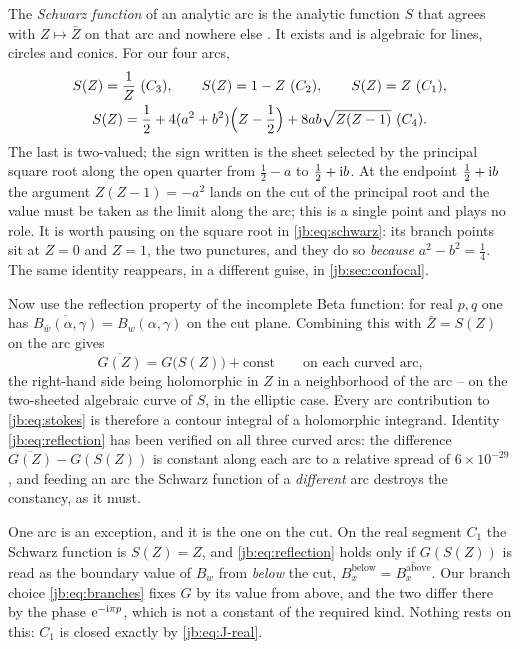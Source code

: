 The \emph{Schwarz function} of an analytic arc is the analytic function $S$ that agrees with
$Z \mapsto \bar Z$ on that arc and nowhere else \cite{Davis:1974:SchwarzFunction}.
It exists and is algebraic for lines, circles and conics.
For our four arcs,
\begin{subequations}
  \label{jb:eq:schwarz}
\begin{gather}
  S(Z)
    = \frac{1}{Z} \ (C_3),
  \qquad
  S(Z)
    = 1 - Z \ (C_2),
  \qquad
  S(Z)
    = Z \ (C_1),
  \\
  S(Z)
    = \frac12 + 4 (a^2 + b^2) \Bigl( Z - \frac12 \Bigr) + 8 a b \sqrt{Z (Z - 1)} \ (C_4).
\end{gather}
\end{subequations}
The last is two-valued; the sign written is the sheet selected by the principal square root along
the open quarter from $\tfrac12 - a$ to $\tfrac12 + \mathrm{i} b$.
At the endpoint $\tfrac12 + \mathrm{i} b$ the argument $Z(Z - 1) = -a^2$ lands on the cut of the principal
root and the value must be taken as the limit along the arc; this is a single point and plays no
role.
It is worth pausing on the square root in \eqref{jb:eq:schwarz}: its branch points sit at $Z = 0$ and
$Z = 1$, the two punctures, and they do so \emph{because} $a^2 - b^2 = \tfrac14$.
The same identity reappears, in a different guise, in \cref{jb:sec:confocal}.

Now use the reflection property of the incomplete Beta function: for real $p, q$ one has
$\overline{B_{\bar w}(\alpha, \gamma)} = B_w(\alpha, \gamma)$ on the cut plane.
Combining this with $\bar Z = S(Z)$ on the arc gives
\begin{equation}
  \label{jb:eq:reflection}
  \overline{G(Z)}
    = G \bigl( S(Z) \bigr) + \text{const}
  \qquad \text{on each curved arc,}
\end{equation}
the right-hand side being holomorphic in $Z$ in a neighborhood of the arc -- on the two-sheeted
algebraic curve of $S$, in the elliptic case.
Every arc contribution to \eqref{jb:eq:stokes} is therefore a contour integral of a holomorphic
integrand.
Identity \eqref{jb:eq:reflection} has been verified on all three curved arcs: the difference
$\overline{G(Z)} - G(S(Z))$ is constant along each arc to a relative spread of $6 \times 10^{-29}$,
and feeding an arc the Schwarz function of a \emph{different} arc destroys the constancy, as it
must.

One arc is an exception, and it is the one on the cut.
On the real segment $C_1$ the Schwarz function is $S(Z) = Z$, and \eqref{jb:eq:reflection} holds only
if $G(S(Z))$ is read as the boundary value of $B_w$ from \emph{below} the cut,
$B_x^{\text{below}} = \overline{B_x^{\text{above}}}$.
Our branch choice \eqref{jb:eq:branches} fixes $G$ by its value from above, and the two differ there by
the phase $\mathrm{e}^{-\mathrm{i} \pi p}$, which is not a constant of the required kind.
Nothing rests on this: $C_1$ is closed exactly by \eqref{jb:eq:J-real}.


